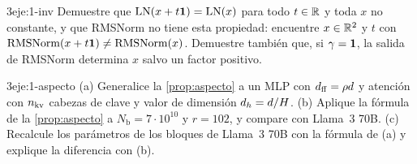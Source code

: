 \begin{ejercicio}{3}{eje:1-inv}
Demuestre que $\operatorname{LN}(x+t\mathbf{1})=\operatorname{LN}(x)$ para todo $t\in\mathbb{R}$ y toda $x$ no constante, y que RMSNorm no tiene esta propiedad: encuentre $x\in\mathbb{R}^{2}$ y $t$ con $\operatorname{RMSNorm}(x+t\mathbf{1})\ne\operatorname{RMSNorm}(x)$. Demuestre también que, si $\gamma=\mathbf{1}$, la salida de RMSNorm determina $x$ salvo un factor positivo.
\end{ejercicio}

\begin{ejercicio}{3}{eje:1-aspecto}
(a) Generalice la \cref{prop:aspecto} a un MLP con $d_{\mathrm{ff}}=\rho d$ y atención con $n_{\mathrm{kv}}$ cabezas de clave y valor de dimensión $d_{h}=d/H$. (b) Aplique la fórmula de la \cref{prop:aspecto} a $N_{\mathrm{b}}=7\cdot 10^{10}$ y $r=102$, y compare con Llama~3 70B. (c) Recalcule los parámetros de los bloques de Llama~3 70B con la fórmula de (a) y explique la diferencia con (b).
\end{ejercicio}
